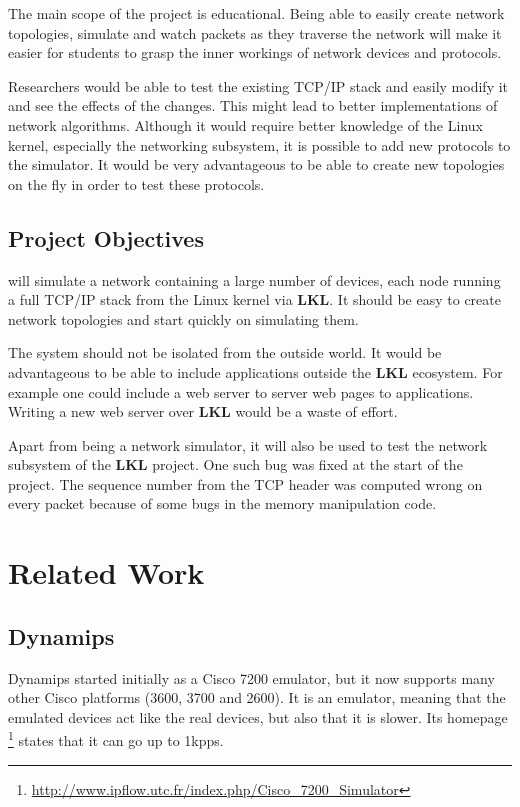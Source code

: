 The main scope of the project is educational. Being able to easily create network topologies, 
simulate and watch packets as they traverse the network will make it easier for students
to grasp the inner workings of network devices and protocols.

Researchers would be able to test the existing TCP/IP stack and easily modify it and see
the effects of the changes. This might lead to better implementations of network
algorithms. Although it would require better knowledge of the Linux kernel, especially
the networking subsystem, it is possible to add new protocols to the simulator. It would
be very advantageous to be able to create new topologies on the fly in order to test these protocols.

\subsection{Project Objectives}
\label{sub-sec:proj-objectives}

\textbf{\project} will simulate a network containing a large number of devices, each node
running a full TCP/IP stack from the Linux kernel via \textbf{LKL}. It should be easy to create 
network topologies and start quickly on simulating them. 

The system should not be isolated from the outside world. It would be advantageous to be able
to include applications outside the \textbf{LKL} ecosystem. For example one could include
a web server to server web pages to applications. Writing a new web server over \textbf{LKL} would
be a waste of effort.

Apart from being a network simulator, it will also be used to test the network subsystem of the \textbf{LKL}
project. One such bug was fixed at the start of the project. The sequence number from the TCP header
was computed wrong on every packet because of some bugs in the memory manipulation code.

\section{Related Work}
\label{sec:proj-related}

\subsection{Dynamips}

Dynamips started initially as a Cisco 7200 emulator, but it now supports many other
Cisco platforms (3600, 3700 and 2600). It is an emulator, meaning that the emulated
devices act like the real devices, but also that it is slower. Its
homepage \footnote{\url{http://www.ipflow.utc.fr/index.php/Cisco_7200_Simulator}}
states that it can go up to 1kpps. 

